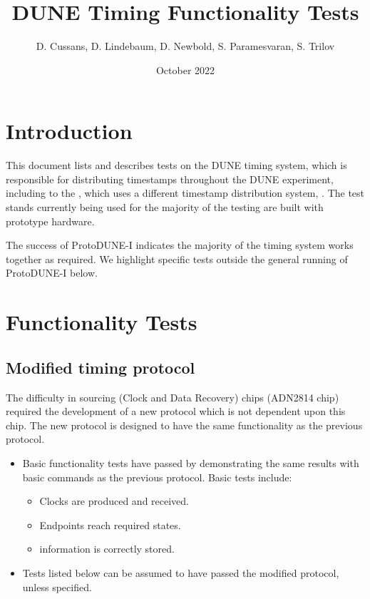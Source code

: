 \documentclass{dune}
\title{DUNE Timing Functionality Tests}
\author{D. Cussans, D. Lindebaum, D. Newbold, S. Paramesvaran, S. Trilov}
\date{October 2022}
\begin{document}
\linenumbers
\maketitle

\tableofcontents


\section{Introduction}
This document lists and describes tests on the DUNE timing system, which is responsible for distributing timestamps throughout the DUNE experiment, including to the  , which uses a different timestamp distribution system, .
The test stands currently being used for the majority of the testing are built with prototype hardware.

The success of ProtoDUNE-I indicates the majority of the timing system works together as required.
We highlight specific tests outside the general running of ProtoDUNE-I below.

\section{Functionality Tests}

\subsection{Modified timing protocol}
The difficulty in sourcing  (Clock and Data Recovery) chips (ADN2814 chip) required the development of a new protocol which is not dependent upon this chip.
The new protocol is designed to have the same functionality as the previous protocol.
\begin{itemize}
  \item Basic functionality tests have passed by demonstrating the same results with basic commands as the previous protocol. Basic tests include:
  \begin{itemize}
  	\item Clocks are produced and received.
  	\item Endpoints reach required states.
  	\item {} information is correctly stored.
  \end{itemize}
  \item Tests listed below can be assumed to have passed the modified protocol, unless specified.
\end{itemize}
\end{document}
